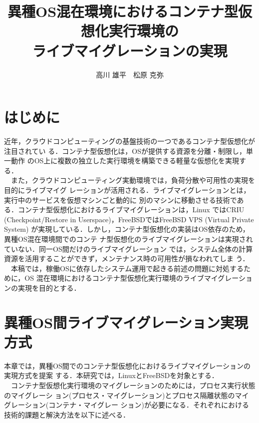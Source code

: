\documentclass{ipsjpapers}
\title{異種OS混在環境におけるコンテナ型仮想化実行環境の\\ライブマイグレーションの実現}
\author{高川 雄平　松原 克弥}
\begin{document}
\maketitle
\section{はじめに}
近年，クラウドコンピューティングの基盤技術の一つであるコンテナ型仮想化が注目されてい
る\cite{focus-container}．コンテナ型仮想化は，OSが提供する資源を分離・制限し，単一動作
のOS上に複数の独立した実行環境を構築できる軽量な仮想化を実現する．\\
　また，クラウドコンピューティング実動環境では，負荷分散や可用性の実現を目的にライブマイグ
レーションが活用される．ライブマイグレーションとは，実行中のサービスを仮想マシンごと動的に
別のマシンに移動させる技術である．コンテナ型仮想化におけるライブマイグレーションは，Linux
ではCRIU (Checkpoint/Restore in Userspace)\cite{criu}，FreeBSDではFreeBSD VPS (Virtual Private System)\cite{freebsd-vps}
が実現している．しかし，コンテナ型仮想化の実装はOS依存のため，異種OS混在環境間でのコンテ
ナ型仮想化のライブマイグレーションは実現されていない．同一OS間だけのライブマイグレーション
では，システム全体の計算資源を活用することができず，メンテナンス時の可用性が損なわれてしま
う．\\
　本稿では，稼働OSに依存したシステム運用で起きる前述の問題に対処するために，OS
混在環境におけるコンテナ型仮想化実行環境のライブマイグレーションの実現を目的とする．

\section{異種OS間ライブマイグレーション実現方式}
本章では，異種OS間でのコンテナ型仮想化におけるライブマイグレーションの実現方式を提案
する．本研究では，LinuxとFreeBSDを対象とする．\\
　コンテナ型仮想化実行環境のマイグレーションのためには，プロセス実行状態のマイグレーシ
ョン(プロセス・マイグレーション)とプロセス隔離状態のマイグレーション(コンテナ・マイグレー
ション)が必要になる．それぞれにおける技術的課題と解決方法を以下に述べる．
\end{document}
